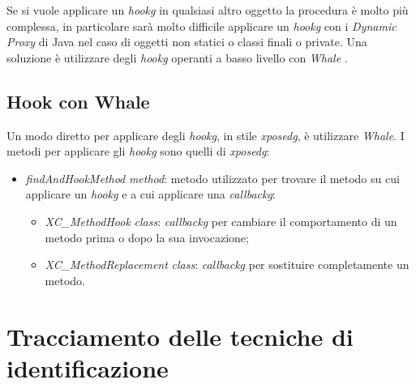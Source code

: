 Se si vuole applicare un \emph{\gls{hookg}} in qualsiasi altro oggetto la procedura è molto più complessa, in particolare sarà molto difficile applicare un \emph{\gls{hookg}} con i \emph{Dynamic Proxy} di Java nel caso di oggetti non statici o classi finali o private.
Una soluzione è utilizzare degli \emph{\gls{hookg}} operanti a basso livello con \emph{Whale} \cite{whale}.

\subsection*{Hook con Whale}

Un modo diretto per applicare degli \emph{\gls{hookg}}, in stile \emph{\gls{xposedg}}\glsfirstoccur, è utilizzare \emph{Whale}. 
I metodi per applicare gli \emph{\gls{hookg}} sono quelli di \emph{\gls{xposedg}}:
\begin{itemize}
    \item \emph{findAndHookMethod} \emph{method}: metodo utilizzato per trovare il metodo su cui applicare un \emph{\gls{hookg}} e a cui applicare una \emph{\gls{callbackg}}:
    \begin{itemize}
        \item \emph{XC\_MethodHook} \emph{class}: \emph{\gls{callbackg}} per cambiare il comportamento di un metodo prima o dopo la sua invocazione;
        \item \emph{XC\_MethodReplacement} \emph{class}: \emph{\gls{callbackg}} per sostituire completamente  un metodo.
    \end{itemize}
\end{itemize}



\section{Tracciamento delle tecniche di identificazione}

